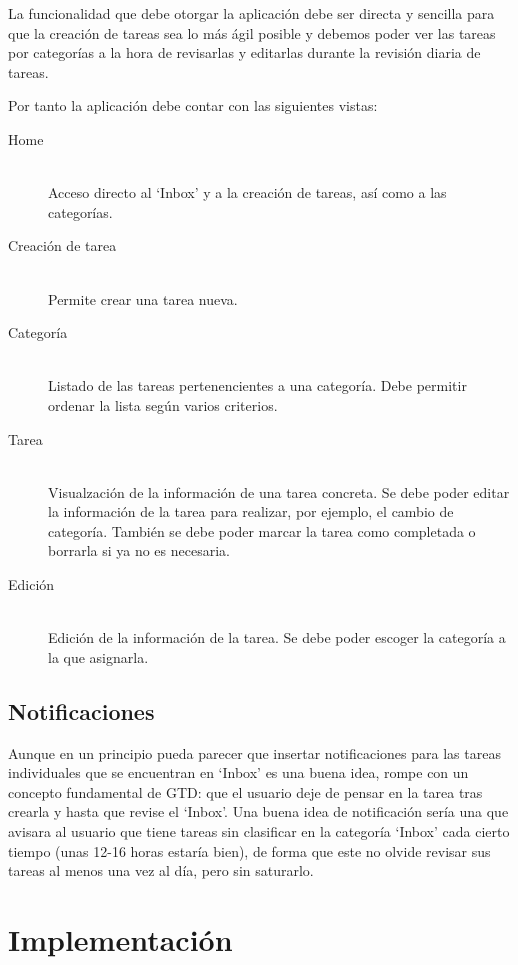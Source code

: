 \documentclass[parskip=half*]{scrartcl}
\begin{document}
La funcionalidad que debe otorgar la aplicaci\'on debe ser directa y sencilla para que la creaci\'on de tareas sea lo m\'as \'agil posible y debemos poder ver las tareas por categor\'ias a la hora de revisarlas y editarlas durante la revisi\'on diaria de tareas.

Por tanto la aplicaci\'on debe contar con las siguientes vistas:

\begin{description}
	\item[Home] \hfill \\ Acceso directo al `Inbox' y a la creaci\'on de tareas, as\'i como a las categor\'ias.
	\item[Creaci\'on de tarea] \hfill \\ Permite crear una tarea nueva.
	\item[Categor\'ia] \hfill \\ Listado de las tareas pertenencientes a una categor\'ia. Debe permitir ordenar la lista seg\'un varios criterios.
	\item[Tarea] \hfill \\ Visualzaci\'on de la informaci\'on de una tarea concreta. Se debe poder editar la informaci\'on de la tarea para realizar, por ejemplo, el cambio de categor\'ia. Tambi\'en se debe poder marcar la tarea como completada o borrarla si ya no es necesaria.
	\item[Edici\'on]	\hfill \\ Edici\'on de la informaci\'on de la tarea. Se debe poder escoger la categor\'ia a la que asignarla.
\end{description}

\subsection{Notificaciones}

Aunque en un principio pueda parecer que insertar notificaciones para las tareas individuales que se encuentran en `Inbox' es una buena idea, rompe con un concepto fundamental de GTD: que el usuario deje de pensar en la tarea tras crearla y hasta que revise el `Inbox'. Una buena idea de notificaci\'on ser\'ia una que avisara al usuario que tiene tareas sin clasificar en la categor\'ia `Inbox' cada cierto tiempo (unas 12-16 horas estar\'ia bien), de forma que este no olvide revisar sus tareas al menos una vez al d\'ia, pero sin saturarlo.

\section{Implementaci\'on}
\end{document}

